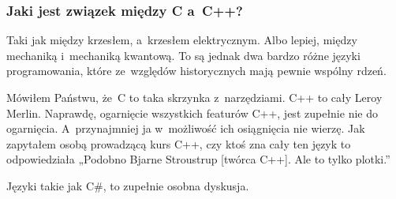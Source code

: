\documentclass[10pt,t]{beamer}
\begin{document}
\begin{frame}
  \frametitle{Jaki jest związek między C a~C++?}


  Taki jak między krzesłem, a~krzesłem elektrycznym. Albo lepiej, między
  mechaniką i~mechaniką kwantową. To są jednak dwa bardzo różne języki
  programowania, które ze~względów historycznych mają pewnie wspólny rdzeń.

  Mówiłem Państwu, że~C to taka skrzynka z~narzędziami. C++ to cały Leroy
  Merlin. Naprawdę, ogarnięcie wszystkich featurów C++, jest zupełnie nie do
  ogarnięcia. A~przynajmniej ja w~możliwość ich osiągnięcia nie wierzę.
  Jak zapytałem osobą prowadzącą kurs C++, czy ktoś zna cały ten język
  to odpowiedziała „Podobno Bjarne Stroustrup [twórca C++]. Ale to tylko
  plotki.”

  Języki takie jak C\#, to zupełnie osobna dyskusja.

\end{frame}












\end{document}
